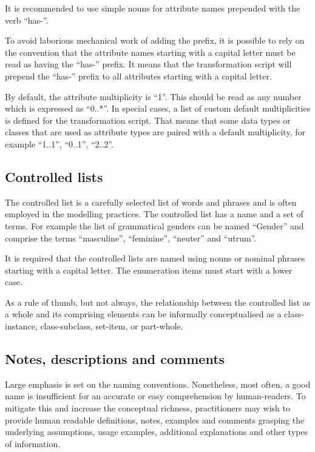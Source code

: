 	It is recommended to use simple nouns for attribute names prepended with the verb ``has-''.
	
	To avoid laborious mechanical work of adding the prefix, it is possible to rely on the convention that the attribute names starting with a capital letter must be read as having the ``has-'' prefix. It means that the transformation script will prepend the ``has-'' prefix to all attributes starting with a capital letter.
	
	By default, the attribute multiplicity is ``1''. This should be read as any number which is expressed as ``0..*''. In special cases, a list of custom default multiplicities is defined for the transformation script. That means that some data types or classes that are used as attribute types are paired with a default multiplicity, for example ``1..1'', ``0..1'', ``2..2''. 
	
	\subsection{Controlled lists}
	\label{sec:controlled-list}
	
	The controlled list is a carefully selected list of words and phrases and is often employed in the modelling practices. The controlled list has a name and a set of terms. For example the list of grammatical genders can be named ``Gender'' and comprise the terms ``masculine'', ``feminine'', ``neuter'' and ``utrum''. 
	
	It is required that the controlled lists are named using nouns or nominal phrases starting with a capital letter. The enumeration items must start with a lower case. 
	
	As a rule of thumb, but not always, the relationship between the controlled list as a whole and its comprising elements can be informally conceptualised as a class-instance, class-subclass, set-item, or part-whole.
	
	\subsection{Notes, descriptions and comments}
	\label{sec:descriptions}
	
	Large emphasis is set on the naming conventions. Nonetheless, most often, a good name is insufficient for an accurate or easy comprehension by human-readers. To mitigate this and increase the conceptual richness, practitioners may wish to provide human readable definitions, notes, examples and comments grasping the underlying assumptions, usage examples, additional explanations and other types of information. 
	
